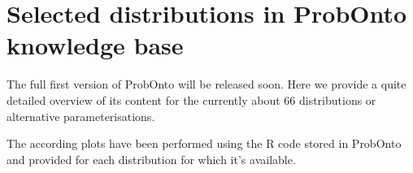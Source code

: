

\chapter{Selected distributions in ProbOnto knowledge base}
\label{ch:probontoAppendix}

The full first version of ProbOnto will be released soon. Here we provide 
a quite detailed overview of its content for the currently about 66 distributions
or alternative parameterisations. 

The according plots have been performed using the R code stored in ProbOnto 
and provided for each distribution for which it's available.


